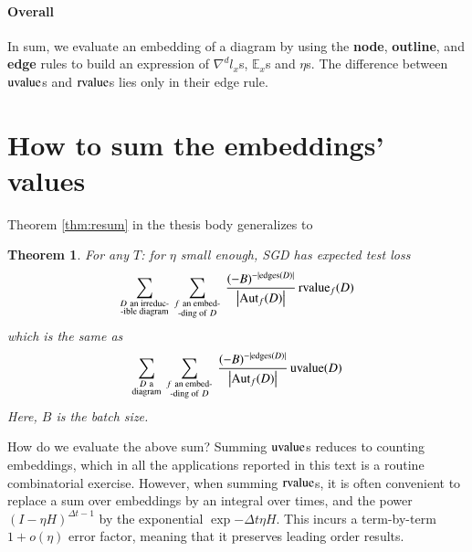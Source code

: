 \documentclass[openany, notitlepage, justified]{tufte-book}
\theoremstyle{plain}
\newtheorem*{thm*}{Theorem}
\theoremstyle{definition}
\newcommand{\wrap}[1]{\left(#1\right)}
\newcommand{\wabs}[1]{\left|#1\right|}
\newcommand{\Aut}{\text{\textnormal{Aut}}}
\newcommand{\uvalue}{\text{\textnormal{uvalue}}}
\newcommand{\rvalue}{\text{\textnormal{rvalue}}}
\newcommand{\edges}{\text{\textnormal{edges}}}
\newcommand{\expc}{\mathbb{E}}
\begin{document}
        \paragraph{Overall}
            In sum, we evaluate an embedding of a diagram by using the 
            \textbf{node}, 
            \textbf{outline}, and
            \textbf{edge}
            rules to build an expression of $\nabla^d l_x$s, $\expc_x$s and
            $\eta$s.  The difference between $\uvalue$s and $\rvalue$s lies
            only in their edge rule.

    \section{How to sum the embeddings' values}                  \label{appendix:sum-embeddings}
        Theorem \ref{thm:resum} in the thesis body generalizes to
        \begin{thm*}
            For any $T$: for $\eta$ small enough, SGD has expected test loss
            \begin{equation*}
                \sum_{\substack{D~\text{an irreduc-} \\ \text{-ible diagram}}}
                ~
                \sum_{\substack{f~\text{an embed-} \\ \text{-ding of}~D}}
                ~
                \frac{(-B)^{-|\edges(D)|}}{\wabs{\Aut_f(D)}}
                \,
                {\rvalue_f}(D)
            \end{equation*}
            which is the same as
            \begin{equation*}
                \sum_{\substack{D~\text{a} \\ \text{diagram}}}
                ~
                \sum_{\substack{f~\text{an embed-} \\ \text{-ding of}~D}}
                ~
                \frac{(-B)^{-|\edges(D)|}}{\wabs{\Aut_f(D)}}
                \,
                {\uvalue}(D)
            \end{equation*}
            Here, $B$ is the batch size.
        \end{thm*}

        How do we evaluate the above sum?
        Summing $\uvalue$s reduces to counting embeddings, which in all the
        applications reported in this text is a routine combinatorial exercise. 
        However, when summing $\rvalue$s, it is often convenient to replace
        a sum over embeddings by an integral over times, and
        the power $\wrap{I-\eta H}^{\Delta t-1}$ by
        the exponential $\exp{-\Delta t \eta H}$.  This incurs a term-by-term
        $1+o(\eta)$ error factor, meaning that it preserves leading order
        results. 
\end{document}
